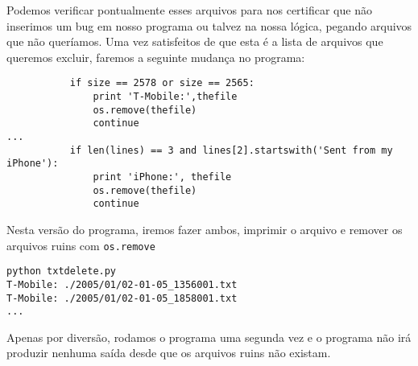 Podemos verificar pontualmente esses arquivos para nos certificar que não inserimos um bug em nosso programa
ou talvez na nossa lógica, pegando arquivos que não queríamos.
Uma vez satisfeitos de que esta é a lista de arquivos que queremos excluir, faremos a seguinte mudança no programa:

\beforeverb
\begin{verbatim}
           if size == 2578 or size == 2565:
               print 'T-Mobile:',thefile
               os.remove(thefile)
               continue
...
           if len(lines) == 3 and lines[2].startswith('Sent from my iPhone'):
               print 'iPhone:', thefile
               os.remove(thefile)
               continue
\end{verbatim}
\afterverb

Nesta versão do programa, iremos fazer ambos, imprimir o arquivo e remover os arquivos ruins com {\tt os.remove}

\beforeverb
\begin{verbatim}
python txtdelete.py 
T-Mobile: ./2005/01/02-01-05_1356001.txt
T-Mobile: ./2005/01/02-01-05_1858001.txt
...
\end{verbatim}
\afterverb

Apenas por diversão, rodamos o programa uma segunda vez e o programa não irá produzir nenhuma saída desde que os arquivos ruins não existam.

